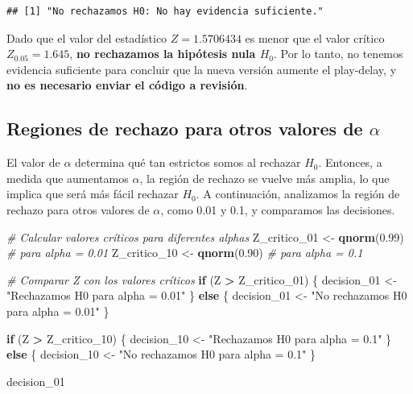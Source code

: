 \documentclass[
]{article}
\newenvironment{Shaded}{\begin{snugshade}}{\end{snugshade}}
\newcommand{\CommentTok}[1]{\textcolor[rgb]{0.56,0.35,0.01}{\textit{#1}}}
\newcommand{\ControlFlowTok}[1]{\textcolor[rgb]{0.13,0.29,0.53}{\textbf{#1}}}
\newcommand{\FloatTok}[1]{\textcolor[rgb]{0.00,0.00,0.81}{#1}}
\newcommand{\FunctionTok}[1]{\textcolor[rgb]{0.13,0.29,0.53}{\textbf{#1}}}
\newcommand{\NormalTok}[1]{#1}
\newcommand{\OtherTok}[1]{\textcolor[rgb]{0.56,0.35,0.01}{#1}}
\newcommand{\SpecialCharTok}[1]{\textcolor[rgb]{0.81,0.36,0.00}{\textbf{#1}}}
\newcommand{\StringTok}[1]{\textcolor[rgb]{0.31,0.60,0.02}{#1}}
\begin{document}
\begin{verbatim}
## [1] "No rechazamos H0: No hay evidencia suficiente."
\end{verbatim}

Dado que el valor del estadístico \(Z = 1.5706434\) es menor que el
valor crítico \(Z_{0.05} = 1.645\), \textbf{no rechazamos la hipótesis
nula \(H_0\)}. Por lo tanto, no tenemos evidencia suficiente para
concluir que la nueva versión aumente el play-delay, y \textbf{no es
necesario enviar el código a revisión}.

\subsection{\texorpdfstring{Regiones de rechazo para otros valores de
\(\alpha\)}{Regiones de rechazo para otros valores de \textbackslash alpha}}\label{regiones-de-rechazo-para-otros-valores-de-alpha}

El valor de \(\alpha\) determina qué tan estrictos somos al rechazar
\(H_0\). Entonces, a medida que aumentamos \(\alpha\), la región de
rechazo se vuelve más amplia, lo que implica que será más fácil rechazar
\(H_0\). A continuación, analizamos la región de rechazo para otros
valores de \(\alpha\), como 0.01 y 0.1, y comparamos las decisiones.

\begin{Shaded}
\begin{Highlighting}[]
\CommentTok{\# Calcular valores críticos para diferentes alphas}
\NormalTok{Z\_critico\_01 }\OtherTok{\textless{}{-}} \FunctionTok{qnorm}\NormalTok{(}\FloatTok{0.99}\NormalTok{)  }\CommentTok{\# para alpha = 0.01}
\NormalTok{Z\_critico\_10 }\OtherTok{\textless{}{-}} \FunctionTok{qnorm}\NormalTok{(}\FloatTok{0.90}\NormalTok{)  }\CommentTok{\# para alpha = 0.1}

\CommentTok{\# Comparar Z con los valores críticos}
\ControlFlowTok{if}\NormalTok{ (Z }\SpecialCharTok{\textgreater{}}\NormalTok{ Z\_critico\_01) \{}
\NormalTok{  decision\_01 }\OtherTok{\textless{}{-}} \StringTok{"Rechazamos H0 para alpha = 0.01"}
\NormalTok{\} }\ControlFlowTok{else}\NormalTok{ \{}
\NormalTok{  decision\_01 }\OtherTok{\textless{}{-}} \StringTok{"No rechazamos H0 para alpha = 0.01"}
\NormalTok{\}}

\ControlFlowTok{if}\NormalTok{ (Z }\SpecialCharTok{\textgreater{}}\NormalTok{ Z\_critico\_10) \{}
\NormalTok{  decision\_10 }\OtherTok{\textless{}{-}} \StringTok{"Rechazamos H0 para alpha = 0.1"}
\NormalTok{\} }\ControlFlowTok{else}\NormalTok{ \{}
\NormalTok{  decision\_10 }\OtherTok{\textless{}{-}} \StringTok{"No rechazamos H0 para alpha = 0.1"}
\NormalTok{\}}

\NormalTok{decision\_01}
\end{Highlighting}
\end{Shaded}
\end{document}

